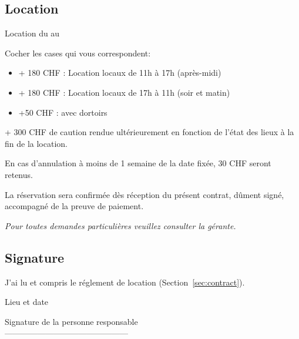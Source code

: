 \documentclass[a4paper,12pt]{extarticle}
\begin{document}
\subsection*{Location}

Location du  au 

Cocher les cases qui vous correspondent:

\begin{itemize}
    \item[]  + 180 CHF : Location locaux de 11h à 17h (après-midi)
    \item[]  + 180 CHF : Location locaux de 17h à 11h (soir et matin)
    \item[]  +50 CHF : avec dortoirs
\end{itemize}

+ 300 CHF de caution rendue ultérieurement en fonction de l'état des lieux à la fin de la location.

En cas d'annulation à moins de 1 semaine de la date fixée, 30 CHF seront retenus.

La réservation sera confirmée dès réception du présent contrat, dûment signé, accompagné de la preuve de paiement.

\textit{Pour toutes demandes particulières veuillez consulter la gérante.}

\subsection*{Signature}

 J'ai lu et compris le réglement de location (Section~\ref{sec:contract}).


Lieu et date  

Signature de la personne responsable\\[1.5cm]
---------------------------------------------
\end{document}
